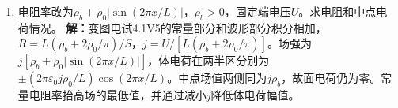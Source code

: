 \documentclass[UTF8,fontset=fandol,a4paper,11pt]{ctexart}
\begin{document}
\begin{enumerate}
\item 电阻率改为$\rho_b+\rho_0|\sin(2\pi x/L)|$，$\rho_b>0$，固定端电压$U$。求电阻和中点电荷情况。
\textbf{解：}变图电试4.1V5的常量部分和波形部分积分相加，$R=L(\rho_b+2\rho_0/\pi)/S$，$j=U/[L(\rho_b+2\rho_0/\pi)]$。场强为$j[\rho_b+\rho_0|\sin(2\pi x/L)|]$，体电荷在两半区分别为$\pm(2\pi\varepsilon_0j\rho_0/L)\cos(2\pi x/L)$。中点场值两侧同为$j\rho_b$，故面电荷仍为零。常量电阻率抬高场的最低值，并通过减小$j$降低体电荷幅值。
\begin{center}\begin{minipage}{.98\linewidth}\centering
{}
\end{minipage}
\end{center}
\end{enumerate}
\end{document}
